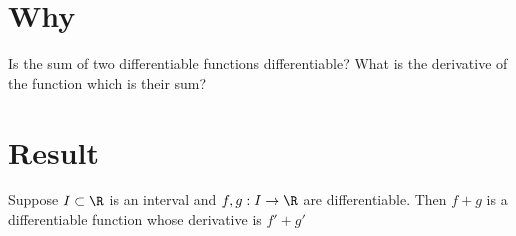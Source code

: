
\section*{Why}

Is the sum of two differentiable functions differentiable?
What is the derivative of the function which is their sum?

\section*{Result}

\begin{proposition}
Suppose $I \subset \R $ is an interval and $f, g: I \to \R $ are differentiable.
Then $f + g$ is a differentiable function whose derivative is $f' + g'$
\end{proposition}


\blankpage